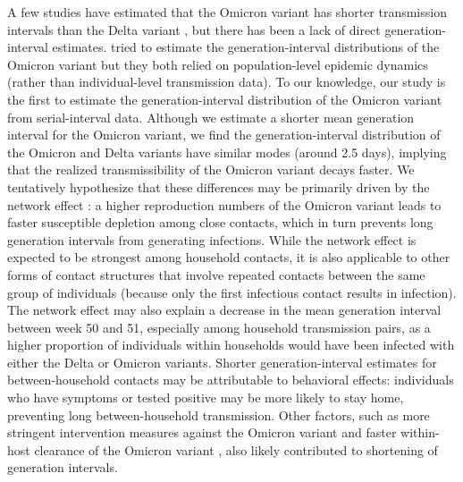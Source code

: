 \documentclass[12pt]{article}
\begin{document}
A few studies have estimated that the Omicron variant has shorter transmission intervals than the Delta variant \citep{abbott2022test,kremer2022observed,song2022serial}, but there has been a lack of direct generation-interval estimates.
\cite{ito2022estimating,selby2022generation} tried to estimate the generation-interval distributions of the Omicron variant but they both relied on population-level epidemic dynamics (rather than individual-level transmission data).
To our knowledge, our study is the first to estimate the generation-interval distribution of the Omicron variant from serial-interval data.
Although we estimate a shorter mean generation interval for the Omicron variant, we find the generation-interval distribution of the Omicron and Delta variants have similar modes (around 2.5 days), implying that the realized transmissibility of the Omicron variant decays faster.
We tentatively hypothesize that these differences may be primarily driven by the network effect \citep{park2020inferring,hart2022generation}: a higher reproduction numbers of the Omicron variant leads to faster susceptible depletion among close contacts, which in turn prevents long generation intervals from generating infections. 
While the network effect is expected to be strongest among household contacts, it is also applicable to other forms of contact structures that involve repeated contacts between the same group of individuals (because only the first infectious contact results in infection).
The network effect may also explain a decrease in the mean generation interval between week 50 and 51, especially among household transmission pairs, as a higher proportion of individuals within households would have been infected with either the Delta or Omicron variants.
Shorter generation-interval estimates for between-household contacts may be attributable to behavioral effects: individuals who have symptoms or tested positive may be more likely to stay home, preventing long between-household transmission.
Other factors, such as more stringent intervention measures against the Omicron variant \citep{backer2021omicron} and faster within-host clearance of the Omicron variant \citep{hay2022viral}, also likely contributed to shortening of generation intervals.
\end{document}
